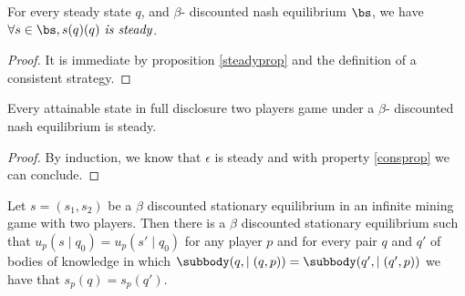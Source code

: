 \begin{myprop}
	\label{consprop}
	For every steady state $q$, and $\beta$- discounted nash equilibrium $\bs$, we have $\forall s \in \bs, s(q)(q) \textit{ is steady}$.
\end{myprop}
\begin{proof}
	It is immediate by proposition \ref{steadyprop} and the definition of a consistent strategy.
\end{proof}

\begin{myprop}
	Every attainable state in full disclosure two players game under a $\beta$- discounted nash equilibrium is steady.
\end{myprop}
\begin{proof}
	By induction, we know that $\epsilon$ is steady and with property \ref{consprop} we can conclude. 
\end{proof}


\fi
\begin{mylem}
	Let $s = (s_1,s_2)$ be a $\beta$ discounted stationary equilibrium in an infinite mining game with two players. 
	Then there is a $\beta$ discounted stationary equilibrium such that $u_p(s \mid q_0) = u_p(s' \mid q_0)$ for 
	any player $p$ and for every pair $q$ and $q'$ of 
	bodies of knowledge in which $\subbody(q,\mid(q,p)) = \subbody(q',\mid(q',p))$ we have that 
	$s_p(q) = s_p(q')$. 
\end{mylem}

